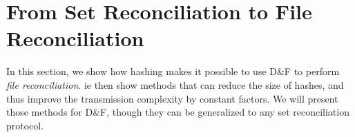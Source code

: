 \documentclass{llncs}
\newcommand{\Set}{\mathcal{H}}
\newcommand{\df}{D\&F\xspace}
\newcommand{\Hash}{\ensuremath{\mathtt{Hash}}}
\begin{document}
%
%
%
%

\section{From Set Reconciliation to File Reconciliation}
\label{sec:hashing}

In this section, we show how hashing makes it possible to use \df to perform \emph{file reconciliation}.
ie then show methods that can reduce the size of hashes, and thus improve the transmission complexity by constant factors. We will present those methods for \df, though they can be generalized to any set reconciliation protocol.
\end{document}
